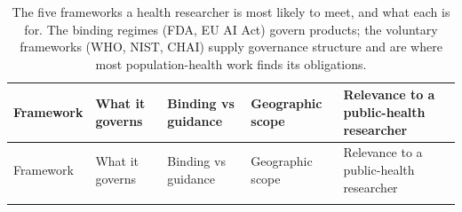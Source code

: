 \documentclass[
  letterpaper,
  11pt]{scrbook}
\begin{document}
\begin{longtable}[]{@{}
  >{\raggedright\arraybackslash}p{}
  >{\raggedright\arraybackslash}p{}
  >{\raggedright\arraybackslash}p{}
  >{\raggedright\arraybackslash}p{}
  >{\raggedright\arraybackslash}p{}@{}}
\caption{The five frameworks a health researcher is most likely to meet,
and what each is for. The binding regimes (FDA, EU AI Act) govern
products; the voluntary frameworks (WHO, NIST, CHAI) supply governance
structure and are where most population-health work finds its
obligations.}\label{tbl-framework-comparison}\tabularnewline
\toprule\noalign{}
\begin{minipage}[b]{\linewidth}\raggedright
Framework
\end{minipage} & \begin{minipage}[b]{\linewidth}\raggedright
What it governs
\end{minipage} & \begin{minipage}[b]{\linewidth}\raggedright
Binding vs guidance
\end{minipage} & \begin{minipage}[b]{\linewidth}\raggedright
Geographic scope
\end{minipage} & \begin{minipage}[b]{\linewidth}\raggedright
Relevance to a public-health researcher
\end{minipage} \\
\midrule\noalign{}
\endfirsthead
\toprule\noalign{}
\begin{minipage}[b]{\linewidth}\raggedright
Framework
\end{minipage} & \begin{minipage}[b]{\linewidth}\raggedright
What it governs
\end{minipage} & \begin{minipage}[b]{\linewidth}\raggedright
Binding vs guidance
\end{minipage} & \begin{minipage}[b]{\linewidth}\raggedright
Geographic scope
\end{minipage} & \begin{minipage}[b]{\linewidth}\raggedright
Relevance to a public-health researcher
\end{minipage} \\
\midrule\noalign{}
\endhead
\bottomrule\noalign{}

\end{longtable}
\end{document}
